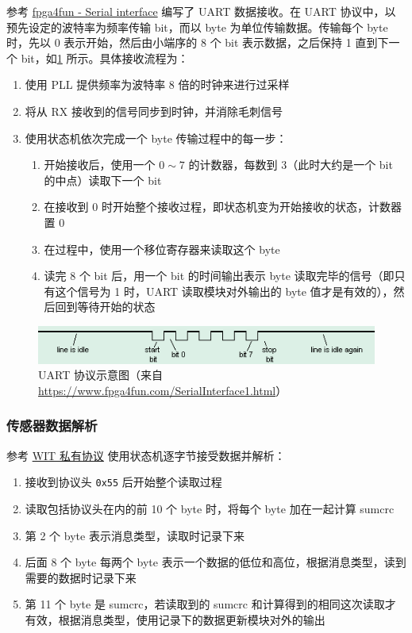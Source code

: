 \documentclass[UTF8, 11pt, fontset=none]{ctexart}
\begin{document}
参考 \href{https://www.fpga4fun.com/SerialInterface.html}{fpga4fun - Serial interface} 编写了 UART 数据接收。在 UART 协议中，以预先设定的波特率为频率传输 bit，而以 byte 为单位传输数据。传输每个 byte 时，先以 0 表示开始，然后由小端序的 8 个 bit 表示数据，之后保持 1 直到下一个 bit，如\cref{uart} 所示。具体接收流程为：

\begin{enumerate}
    \item 使用 PLL 提供频率为波特率 8 倍的时钟来进行过采样
    \item 将从 RX 接收到的信号同步到时钟，并消除毛刺信号
    \item 使用状态机依次完成一个 byte 传输过程中的每一步：
        \begin{enumerate}
            \item 开始接收后，使用一个 $0 \sim 7$ 的计数器，每数到 3（此时大约是一个 bit 的中点）读取下一个 bit
            \item 在接收到 0 时开始整个接收过程，即状态机变为开始接收的状态，计数器置 0
            \item 在过程中，使用一个移位寄存器来读取这个 byte
            \item 读完 8 个 bit 后，用一个 bit 的时间输出表示 byte 读取完毕的信号（即只有这个信号为 1 时，UART 读取模块对外输出的 byte 值才是有效的），然后回到等待开始的状态
        \end{enumerate}
\end{enumerate}

\begin{figure}[H]
    \centering
    \includegraphics[width=\textwidth]{images/uart.png}
    \vspace{-16pt}
    \caption{UART 协议示意图（来自 \url{https://www.fpga4fun.com/SerialInterface1.html}）}
    \label{uart}
\end{figure}

\subsubsection{传感器数据解析}

参考 \href{https://wit-motion.yuque.com/wumwnr/ltst03/vl3tpy}{WIT 私有协议} 使用状态机逐字节接受数据并解析：

\begin{enumerate}
    \item 接收到协议头 \texttt{0x55} 后开始整个读取过程
    \item 读取包括协议头在内的前 10 个 byte 时，将每个 byte 加在一起计算 sumcrc
    \item 第 2 个 byte 表示消息类型，读取时记录下来
    \item 后面 8 个 byte 每两个 byte 表示一个数据的低位和高位，根据消息类型，读到需要的数据时记录下来
    \item 第 11 个 byte 是 sumcrc，若读取到的 sumcrc 和计算得到的相同这次读取才有效，根据消息类型，使用记录下的数据更新模块对外的输出
\end{enumerate}
\end{document}
